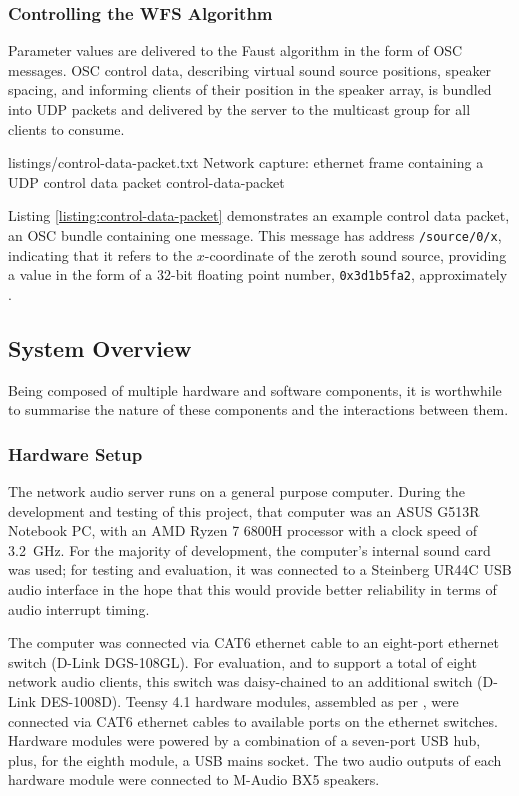 \subsubsection{Controlling the WFS Algorithm}

Parameter values are delivered to the Faust algorithm in the form of OSC
messages.
OSC control data, describing virtual sound source positions, speaker spacing,
and informing clients of their position in the speaker array, is bundled into
UDP packets and delivered by the server to the multicast group for all clients
to consume.

{listings/control-data-packet.txt}
{Network capture: ethernet frame containing a UDP control data packet}
{control-data-packet}

Listing \ref{listing:control-data-packet} demonstrates an example control data
packet, an OSC bundle containing one message.
This message has address \texttt{/source/0/x}, indicating that it refers to the
$x$-coordinate of the zeroth sound source, providing a value in the form of a
32-bit floating point number, \texttt{0x3d1b5fa2}, approximately
.

\subsection{System Overview}\label{subsec:system-overview}

Being composed of multiple hardware and software components, it is worthwhile
to summarise the nature of these components and the interactions between them.

\subsubsection{Hardware Setup}

The network audio server runs on a general purpose computer.
During the development and testing of this project, that computer was an ASUS
G513R Notebook PC, with an AMD Ryzen 7 6800H processor with a clock
speed of \qty{3.2}{\GHz}.
For the majority of development, the computer's internal sound card was used;
for testing and evaluation, it was connected to a Steinberg UR44C USB audio
interface in the hope that this would provide better reliability in terms of
audio interrupt timing.

The computer was connected via CAT6 ethernet cable to an eight-port ethernet
switch (D-Link DGS-108GL).
For evaluation, and to support a total of eight network audio clients, this
switch was daisy-chained to an additional switch (D-Link DES-1008D).
Teensy 4.1 hardware modules, assembled as per , were
connected via CAT6 ethernet cables to available ports on the ethernet switches.
Hardware modules were powered by a combination of a seven-port USB hub, plus,
for the eighth module, a USB mains socket.
The two audio outputs of each hardware module were connected to M-Audio BX5
speakers.

